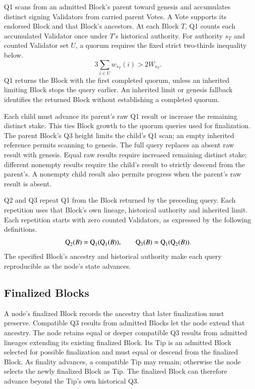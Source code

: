 Q1 scans from an admitted Block's parent toward genesis and accumulates distinct signing Validators from carried parent Votes.
A Vote supports its endorsed Block and that Block's ancestors.
At each Block $T$, Q1 counts each accumulated Validator once under $T$'s historical authority.
For authority $s_T$ and counted Validator set $U$, a quorum requires the fixed strict two-thirds inequality below.
\[
3\sum_{i\in U}w_{s_T}(i)>2W_{s_T}.
\]
Q1 returns the Block with the first completed quorum, unless an inherited limiting Block stops the query earlier.
An inherited limit or genesis fallback identifies the returned Block without establishing a completed quorum.

Each child must advance its parent's raw Q1 result or increase the remaining distinct stake.\label{sec:parent-progress}
This ties Block growth to the quorum queries used for finalization.
The parent Block's Q3 height limits the child's Q1 scan; an empty inherited reference permits scanning to genesis.
The full query replaces an absent raw result with genesis.
Equal raw results require increased remaining distinct stake; different nonempty results require the child's result to strictly descend from the parent's.
A nonempty child result also permits progress when the parent's raw result is absent.

Q2 and Q3 repeat Q1 from the Block returned by the preceding query.
Each repetition uses that Block's own lineage, historical authority and inherited limit.
Each repetition starts with zero counted Validators, as expressed by the following definitions.
\[
\operatorname{Q}_{2}(B)=\operatorname{Q}_{1}(\operatorname{Q}_{1}(B)),\qquad
\operatorname{Q}_{3}(B)=\operatorname{Q}_{1}(\operatorname{Q}_{2}(B)).
\]
The specified Block's ancestry and historical authority make each query reproducible as the node's state advances.

\subsection{Finalized Blocks}\label{sec:finalization}\label{sec:stored-finality}

A node's finalized Block records the ancestry that later finalization must preserve.
Compatible Q3 results from admitted Blocks let the node extend that ancestry.
The node retains equal or deeper compatible Q3 results from admitted lineages extending its existing finalized Block.
Its Tip is an admitted Block selected for possible finalization and must equal or descend from the finalized Block.
As finality advances, a compatible Tip may remain; otherwise the node selects the newly finalized Block as Tip.
The finalized Block can therefore advance beyond the Tip's own historical Q3.

